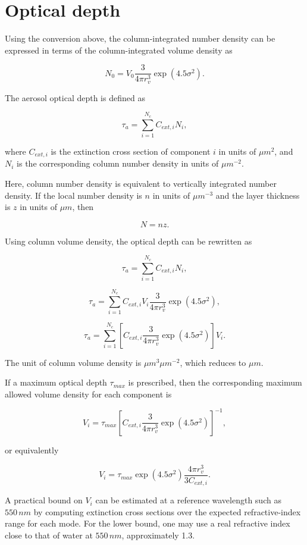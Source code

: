 \documentclass[
  11pt,
  letterpaper,
  DIV=11,
  numbers=noendperiod]{scrreprt}
\begin{document}
\section{Optical depth}\label{optical-depth}

Using the conversion above, the column-integrated number density can be
expressed in terms of the column-integrated volume density as

\[
N_{0}=V_{0} \frac{3}{4 \pi r_{v}^3}\exp(4.5 \sigma^2).
\]

The aerosol optical depth is defined as

\[
\tau_a=\sum_{i=1}^{N_c} C_{ext,i} N_i,
\]

where \(C_{ext,i}\) is the extinction cross section of component \(i\)
in units of \(\mu m^2\), and \(N_i\) is the corresponding column number
density in units of \(\mu m^{-2}\).

Here, column number density is equivalent to vertically integrated
number density. If the local number density is \(n\) in units of
\(\mu m^{-3}\) and the layer thickness is \(z\) in units of \(\mu m\),
then

\[
N = n z.
\]

Using column volume density, the optical depth can be rewritten as

\[
\tau_a = \sum_{i=1}^{N_c} C_{ext,i} N_i,
\]

\[
\tau_a = \sum_{i=1}^{N_c} C_{ext,i} V_i \frac{3}{4 \pi r_{v}^3}\exp(4.5 \sigma^2),
\]

\[
\tau_a = \sum_{i=1}^{N_c} \left[C_{ext,i} \frac{3}{4 \pi r_{v}^3}\exp(4.5 \sigma^2)\right] V_i.
\]

The unit of column volume density is \(\mu m^3 \mu m^{-2}\), which
reduces to \(\mu m\).

If a maximum optical depth \(\tau_{max}\) is prescribed, then the
corresponding maximum allowed volume density for each component is

\[
V_i=\tau_{max}\left[C_{ext,i} \frac{3}{4 \pi r_{v}^3}\exp(4.5 \sigma^2)\right]^{-1},
\]

or equivalently

\[
V_i=\tau_{max} \exp(4.5 \sigma^2) \frac{4 \pi r_{v}^3}{3 C_{ext,i}}.
\]

A practical bound on \(V_i\) can be estimated at a reference wavelength
such as \(550 \, nm\) by computing extinction cross sections over the
expected refractive-index range for each mode. For the lower bound, one
may use a real refractive index close to that of water at \(550 \, nm\),
approximately 1.3.
\end{document}

